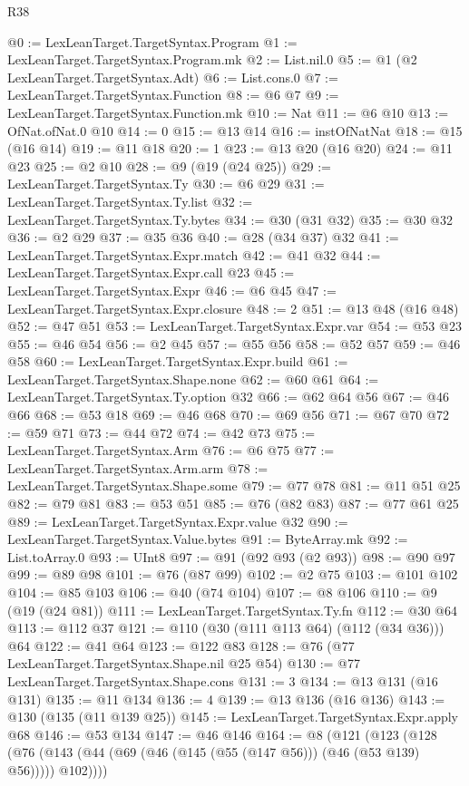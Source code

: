\begin{lexlean}{R38}
\begin{coremodule}
@0 := LexLeanTarget.TargetSyntax.Program
@1 := LexLeanTarget.TargetSyntax.Program.mk
@2 := List.nil.{0}
@5 := @1 (@2 LexLeanTarget.TargetSyntax.Adt)
@6 := List.cons.{0}
@7 := LexLeanTarget.TargetSyntax.Function
@8 := @6 @7
@9 := LexLeanTarget.TargetSyntax.Function.mk
@10 := Nat
@11 := @6 @10
@13 := OfNat.ofNat.{0} @10
@14 := 0
@15 := @13 @14
@16 := instOfNatNat
@18 := @15 (@16 @14)
@19 := @11 @18
@20 := 1
@23 := @13 @20 (@16 @20)
@24 := @11 @23
@25 := @2 @10
@28 := @9 (@19 (@24 @25))
@29 := LexLeanTarget.TargetSyntax.Ty
@30 := @6 @29
@31 := LexLeanTarget.TargetSyntax.Ty.list
@32 := LexLeanTarget.TargetSyntax.Ty.bytes
@34 := @30 (@31 @32)
@35 := @30 @32
@36 := @2 @29
@37 := @35 @36
@40 := @28 (@34 @37) @32
@41 := LexLeanTarget.TargetSyntax.Expr.match
@42 := @41 @32
@44 := LexLeanTarget.TargetSyntax.Expr.call @23
@45 := LexLeanTarget.TargetSyntax.Expr
@46 := @6 @45
@47 := LexLeanTarget.TargetSyntax.Expr.closure
@48 := 2
@51 := @13 @48 (@16 @48)
@52 := @47 @51
@53 := LexLeanTarget.TargetSyntax.Expr.var
@54 := @53 @23
@55 := @46 @54
@56 := @2 @45
@57 := @55 @56
@58 := @52 @57
@59 := @46 @58
@60 := LexLeanTarget.TargetSyntax.Expr.build
@61 := LexLeanTarget.TargetSyntax.Shape.none
@62 := @60 @61
@64 := LexLeanTarget.TargetSyntax.Ty.option @32
@66 := @62 @64 @56
@67 := @46 @66
@68 := @53 @18
@69 := @46 @68
@70 := @69 @56
@71 := @67 @70
@72 := @59 @71
@73 := @44 @72
@74 := @42 @73
@75 := LexLeanTarget.TargetSyntax.Arm
@76 := @6 @75
@77 := LexLeanTarget.TargetSyntax.Arm.arm
@78 := LexLeanTarget.TargetSyntax.Shape.some
@79 := @77 @78
@81 := @11 @51 @25
@82 := @79 @81
@83 := @53 @51
@85 := @76 (@82 @83)
@87 := @77 @61 @25
@89 := LexLeanTarget.TargetSyntax.Expr.value @32
@90 := LexLeanTarget.TargetSyntax.Value.bytes
@91 := ByteArray.mk
@92 := List.toArray.{0}
@93 := UInt8
@97 := @91 (@92 @93 (@2 @93))
@98 := @90 @97
@99 := @89 @98
@101 := @76 (@87 @99)
@102 := @2 @75
@103 := @101 @102
@104 := @85 @103
@106 := @40 (@74 @104)
@107 := @8 @106
@110 := @9 (@19 (@24 @81))
@111 := LexLeanTarget.TargetSyntax.Ty.fn
@112 := @30 @64
@113 := @112 @37
@121 := @110 (@30 (@111 @113 @64) (@112 (@34 @36))) @64
@122 := @41 @64
@123 := @122 @83
@128 := @76 (@77 LexLeanTarget.TargetSyntax.Shape.nil @25 @54)
@130 := @77 LexLeanTarget.TargetSyntax.Shape.cons
@131 := 3
@134 := @13 @131 (@16 @131)
@135 := @11 @134
@136 := 4
@139 := @13 @136 (@16 @136)
@143 := @130 (@135 (@11 @139 @25))
@145 := LexLeanTarget.TargetSyntax.Expr.apply @68
@146 := @53 @134
@147 := @46 @146
@164 := @8
    (@121
      (@123
        (@128 (@76 (@143 (@44 (@69 (@46 (@145 (@55 (@147 @56))) (@46 (@53 @139) @56))))) @102))))

\end{coremodule}
\end{lexlean}
